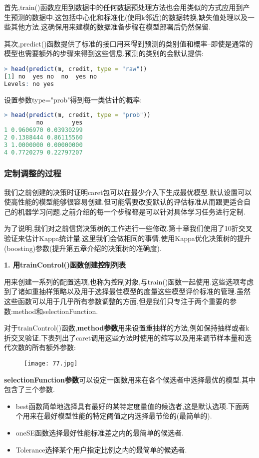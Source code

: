 \documentclass[11pt,a4paper,oneside]{book}
\begin{document}
首先,train()函数应用到数据中的任何数据预处理方法也会用类似的方式应用到产生预测的数据中.这包括中心化和标准化(使用k邻近)的数据转换,缺失值处理以及一些其他方法.这确保用来建模的数据准备步骤在模型部署后仍然保留.

其次,predict()函数提供了标准的接口用来得到预测的类别值和概率--即使是通常的模型也需要额外的步骤来得到这些信息.预测的类别的会默认提供:
\begin{lstlisting}[language=r]
> head(predict(m, credit, type = "raw"))
[1] no  yes no  no  yes no 
Levels: no yes
\end{lstlisting}
设置参数type="prob"得到每一类估计的概率:
\begin{lstlisting}[language=r]
> head(predict(m, credit, type = "prob"))
         no        yes
1 0.9606970 0.03930299
2 0.1388444 0.86115560
3 1.0000000 0.00000000
4 0.7720279 0.22797207
\end{lstlisting}

\subsubsection{定制调整的过程}
我们之前创建的决策时证明caret包可以在最少介入下生成最优模型.默认设置可以使高性能的模型能够很容易创建.但可能需要改变默认的评估标准从而跟更适合自己的机器学习问题.之前介绍的每一个步骤都是可以针对具体学习任务进行定制.

为了说明,我们对之前信贷决策树的工作进行一些修改.第十章我们使用了10折交叉验证来估计Kappa统计量.这里我们会做相同的事情,使用Kappa优化决策树的提升(boosting)参数(提升第五章介绍的决策树的准确度).

\textbf{1. 用trainControl()函数创建控制列表}

用来创建一系列的配置选项,也称为控制对象,与train()函数一起使用.这些选项考虑到了诸如重抽样策略以及用于选择最佳模型的度量这些模型评价标准的管理.虽然这些函数可以用于几乎所有参数调整的方面,但是我们只专注于两个重要的参数:method和selectionFunction.

对于trainControl()函数,\textbf{method参数}用来设置重抽样的方法,例如保持抽样或者k折交叉验证.下表列出了caret调用这些方法时使用的缩写以及用来调节样本量和迭代次数的所有额外参数:
\begin{figure}[H]
	\centering
	\texttt{[image: 77.jpg]}
\end{figure}

\textbf{selectionFunction参数}可以设定一函数用来在各个候选者中选择最优的模型.其中包含了三个参数.
\begin{itemize}
	\item best函数简单地选择具有最好的某特定度量值的候选者,这是默认选项.下面两个用来在最好模型性能的特定阈值之内选择最节俭的(最简单的).
	\item oneSE函数选择最好性能标准差之内的最简单的候选者.
	\item Tolerance选择某个用户指定比例之内的最简单的候选者.
\end{itemize}
\end{document}
